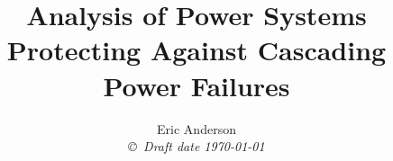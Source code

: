 

\title{ Analysis of Power Systems \\ \large{Protecting Against Cascading Power Failures} }

\author{Eric Anderson \\
{\small\em \copyright \  Draft date \today }}

 \date{ }


\maketitle

\pagestyle{headings}


\tableofcontents

\listoffigures
\listoftables


%

\pagestyle{plain}







\appendix
\appendixpage
\addappheadtotoc

	
		





